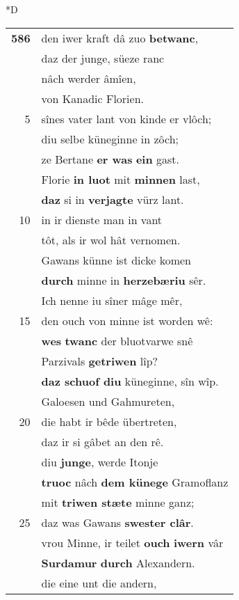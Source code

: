 \documentclass[8pt,a4paper,notitlepage]{article}
\begin{document}
\begin{table}[ht]
\begin{minipage}[t]{0.5\linewidth}
\small
\begin{center}*D
\end{center}
\begin{tabular}{rl}
\textbf{586} & den iwer kraft dâ zuo \textbf{betwanc},\\ 
 & daz der junge, süeze ranc\\ 
 & nâch werder âmîen,\\ 
 & von Kanadic Florien.\\ 
5 & sînes vater lant von kinde er vlôch;\\ 
 & diu selbe küneginne in zôch;\\ 
 & ze Bertane \textbf{er was} \textbf{ein} gast.\\ 
 & Florie \textbf{in luot} mit \textbf{minnen} last,\\ 
 & \textbf{daz} si in \textbf{verjagte} vürz lant.\\ 
10 & in ir dienste man in vant\\ 
 & tôt, als ir wol hât vernomen.\\ 
 & Gawans künne ist dicke komen\\ 
 & \textbf{durch} minne in \textbf{herzebæriu} sêr.\\ 
 & Ich nenne iu sîner mâge mêr,\\ 
15 & den ouch von minne ist worden wê:\\ 
 & \textbf{wes} \textbf{twanc} der bluotvarwe snê\\ 
 & Parzivals \textbf{getriwen} lîp?\\ 
 & \textbf{daz schuof diu} küneginne, sîn wîp.\\ 
 & Galoesen und Gahmureten,\\ 
20 & die habt ir bêde übertreten,\\ 
 & daz ir si gâbet an den rê.\\ 
 & diu \textbf{junge}, werde Itonje\\ 
 & \textbf{truoc} nâch \textbf{dem künege} Gramoflanz\\ 
 & mit \textbf{triwen stæte} minne ganz;\\ 
25 & daz was Gawans \textbf{swester clâr}.\\ 
 & vrou Minne, ir teilet \textbf{ouch} \textbf{iwern} vâr\\ 
 & \textbf{Surdamur} \textbf{durch} Alexandern.\\ 
 & die eine unt die andern,\\ 

\end{tabular}
\end{minipage}
\end{table}
\end{document}
